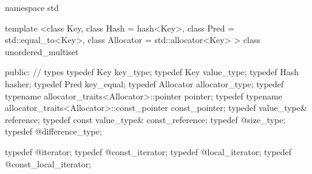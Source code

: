 %
\begin{codeblock}
namespace std {
  template <class Key,
            class Hash = hash<Key>,
            class Pred = std::equal_to<Key>,
            class Allocator = std::allocator<Key> >
  class unordered_multiset
  {
  public:
    // types
    typedef Key                                                 key_type;
    typedef Key                                                 value_type;
    typedef Hash                                                hasher;
    typedef Pred                                                key_equal;
    typedef Allocator                                           allocator_type;
    typedef typename allocator_traits<Allocator>::pointer       pointer;
    typedef typename allocator_traits<Allocator>::const_pointer const_pointer;
    typedef value_type&                                         reference;
    typedef const value_type&                                   const_reference;
    typedef @\impdef@                              size_type;
    typedef @\impdef@                              difference_type;

    typedef @\impdef@                              iterator;
    typedef @\impdef@                              const_iterator;
    typedef @\impdef@                              local_iterator;
    typedef @\impdef@                              const_local_iterator;

}}
\end{codeblock}
